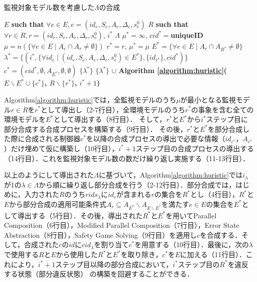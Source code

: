 \begin{algorithm}[h]
\caption{監視対象モデル数を考慮した$\Lambda$の合成}
\label{algorithm:huristic}
\begin{algorithmic}[1]
\renewcommand{\algorithmicrequire}{\textbf{Input:}}
\renewcommand{\algorithmicensure}{\textbf{Output:}}
\REQUIRE $E$ {\bf such that} $\forall e \in E, e = (id_{e}, S_{e}, A_{e}, \Delta_{e}, s^0_{e})$
\REQUIRE $R$ {\bf such that} $\forall r \in R, r = (id_{r}, S_{r}, A_{r}, \Delta_{r}, s^0_{r})$, $i^*$
\ENSURE  $\Lambda$
\STATE $\mu^*= \infty$,\;\; $cid^* = ${\bf uniqueID}
    \STATE $\mu = n(\{\forall e \in E \mid A_e \cap A_r \neq \emptyset\})$
    \IF{$\mu < \mu^*$}
        \STATE $r^* = r$,\;\; $\mu^* = \mu$
    \ENDIF
\ENDFOR
\STATE $E^* = \{\forall e \in E \mid A_{e} \cap A_{R^*} \neq \emptyset\}$
\STATE $\lambda^* = \{(i^*, \{\forall id_{e} \mid (id_{e}, S_{e}, A_{e}, \Delta_{e}, s^0_{e}) \in E^*\}, \{id_{r^*}\}, cid^*)\}$
\STATE $c^* = (cid^*, \emptyset, A_{E^*}, \emptyset, \emptyset)$
 $\{\lambda^*\}$
\ENDIF
{} $\{\lambda^*\}$ $\cup$ {\bf Algorithm \ref{algorithm:huristic}($E \backslash E^* \cup \{c^*\}$, $R \backslash \{r^*\}$, $i^*+1$)}
\end{algorithmic}
\end{algorithm}

Algorithm\ref{algorithm:huristic}では，全監視モデルのうち$\mu$が最小となる監視モデル$r \in R$を$r^*$として導出し（2-7行目），全環境モデルのうち$r^*$の事象を含む全ての環境モデルを$E^*$として導出する（8行目）．
そして，$r^*$と$E^*$から$i^*$ステップ目に部分合成する合成プロセスを構築する（9行目）．
その後，$r^*$と$E^*$を部分合成した際に合成される制御器$c^*$を以降の合成プロセスの導出で必要な情報（$id_{c^*}$，$A_{c^*}$）だけ埋めて仮に構築し（10行目），$i^*+1$ステップ目の合成プロセスの導出する（14行目）．これを監視対象モデル数の数だけ繰り返し実施する（11-13行目）．

以上のようにして導出された$\Lambda$に基づいて，Algorithm\ref{algorithm:huristic}では$i_{\lambda}$が1の$\lambda \in \Lambda$から順に繰り返し部分合成を行う（2-12行目）．部分合成では，はじめに，入力された$R$のうち$rids_{\lambda}$に$id_{r}$が含まれる$r$の集合を$R^*$とし（4行目），$R^*$と$E$から部分合成の適用可能条件式$A_{r} \subseteq A_{E^*} \backslash A_{E \backslash E^*}$を満たす$e \in E$の集合を$E^*$として導出する（5行目）．その後，導出された$R^*$と$E^*$を用いてParallel Composition（6行目），Modified Parallel Composition（7行目），Error State Abstraction（8行目），Safety Game Solving（9行目）を適用し$c$を合成する．そして，合成された$c$の$id$に$cid_{\lambda}$を割り当て$c^*$を用意する（10行目）．最後に，次の$\lambda$で使用する$R$と$E$から使用した$R^*$と$E^*$を取り除き，$c^*$を$E$に加える（11行目）．これにより，$i^*+1$ステップ目以降の部分合成において，$i^*$ステップ目の$R^*$を違反する状態（部分違反状態）
の構築を回避することができる．

